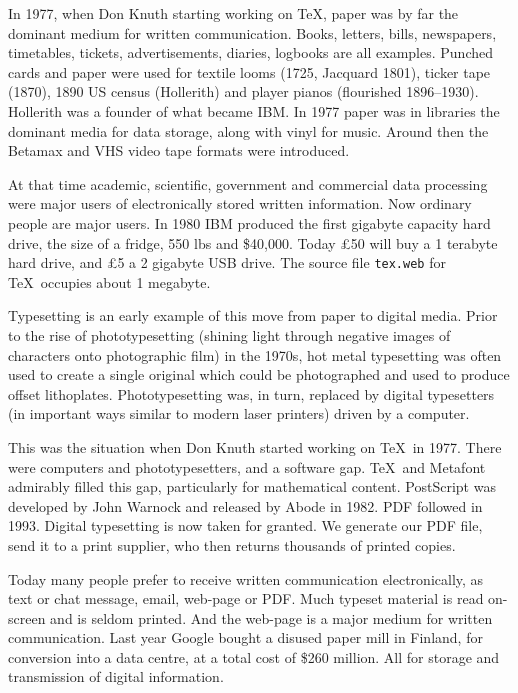 \documentclass[11pt,a4paper]{article}
\begin{document}
In 1977, when Don Knuth starting working on \TeX, paper was by far the
dominant medium for written communication.  Books, letters, bills,
newspapers, timetables, tickets, advertisements, diaries, logbooks are
all examples.  Punched cards and paper were used for textile looms
(1725, Jacquard 1801), ticker tape (1870), 1890 US census (Hollerith)
and player pianos (flourished 1896--1930).  Hollerith was a founder of
what became IBM.  In 1977 paper was in libraries the dominant media
for data storage, along with vinyl for music.  Around then the Betamax
and VHS video tape formats were introduced.

At that time academic, scientific, government and commercial data
processing were major users of electronically stored written
information.  Now ordinary people are major users.  In 1980 IBM
produced the first gigabyte capacity hard drive, the size of a fridge,
550 lbs and \$40,000.  Today \pounds 50 will buy a 1 terabyte hard
drive, and \pounds 5 a 2 gigabyte USB drive.  The source
file \texttt{tex.web} for \TeX\ occupies about 1 megabyte.

Typesetting is an early example of this move from paper to digital
media.  Prior to the rise of phototypesetting (shining light through
negative images of characters onto photographic film) in the 1970s,
hot metal typesetting was often used to create a single original which
could be photographed and used to produce offset lithoplates.
Phototypesetting was, in turn, replaced by digital typesetters (in
important ways similar to modern laser printers) driven by a computer.

This was the situation when Don Knuth started working on \TeX\ in
1977.  There were computers and phototypesetters, and a software
gap. \TeX\ and Metafont admirably filled this gap, particularly for
mathematical content.  PostScript was developed by John Warnock and
released by Abode in 1982.  PDF followed in 1993.  Digital typesetting
is now taken for granted.  We generate our PDF file, send it to a
print supplier, who then returns thousands of printed copies.

Today many people prefer to receive written communication
electronically, as text or chat message, email, web-page or PDF.  Much
typeset material is read on-screen and is seldom printed.  And the
web-page is a major medium for written communication.  Last year
Google bought a disused paper mill in Finland, for conversion into a
data centre, at a total cost of \$260 million.  All for storage and
transmission of digital information.
\end{document}
